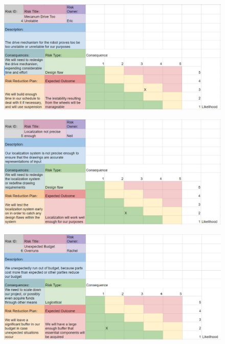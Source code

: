 \begin{figure}[h!]
\centering
\includegraphics[width=0.98\columnwidth]{risks/risk4.JPG}
\label{fig:risk4}
\end{figure}
\begin{figure}[h!]
\centering
\includegraphics[width=0.98\columnwidth]{risks/risk5.JPG}
\label{fig:risk5}
\end{figure}
\begin{figure}[h!]
\centering
\includegraphics[width=0.98\columnwidth]{risks/risk6.JPG}
\label{fig:risk6}
\end{figure}